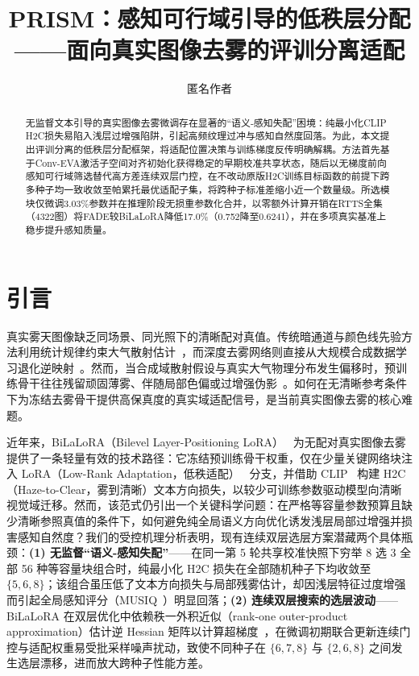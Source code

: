 \documentclass[10pt,twocolumn,letterpaper]{article}
\title{PRISM：感知可行域引导的低秩层分配\\——面向真实图像去雾的评训分离适配}
\author{匿名作者}
\begin{document}
\maketitle
\raggedbottom
\begin{abstract}
无监督文本引导的真实图像去雾微调存在显著的“语义-感知失配”困境：纯最小化CLIP H2C损失易陷入浅层过增强陷阱，引起高频纹理过冲与感知自然度回落。为此，本文提出评训分离的低秩层分配框架\method，将适配位置决策与训练梯度反传明确解耦。方法首先基于Conv-EVA激活子空间对齐初始化获得稳定的早期校准共享状态，随后以无梯度前向感知可行域筛选替代高方差连续双层门控，在不改动原版H2C训练目标函数的前提下跨多种子均一致收敛至帕累托最优适配子集，将跨种子标准差缩小近一个数量级。所选模块仅微调3.03\%参数并在推理阶段无损重参数化合并，以零额外计算开销在RTTS全集（4322图）将FADE较BiLaLoRA降低17.0\%（0.752降至0.6241），并在多项真实基准上稳步提升感知质量。
\par\smallskip{}
\end{abstract}

\section{引言}
真实雾天图像缺乏同场景、同光照下的清晰配对真值。传统暗通道与颜色线先验方法利用统计规律约束大气散射估计~\cite{dcp2009,fattal2014}，而深度去雾网络则直接从大规模合成数据学习退化逆映射~\cite{msbdn2020,dehamer2022,dea2024}。然而，当合成域散射假设与真实大气物理分布发生偏移时，预训练骨干往往残留顽固薄雾、伴随局部色偏或过增强伪影~\cite{reside2019,dad2020,psd2021}。如何在无清晰参考条件下为冻结去雾骨干提供高保真度的真实域适配信号，是当前真实图像去雾的核心难题。

近年来，BiLaLoRA（Bilevel Layer-Positioning LoRA）~\cite{bilalora2026} 为无配对真实图像去雾提供了一条轻量有效的技术路径：它冻结预训练骨干权重，仅在少量关键网络块注入 LoRA（Low-Rank Adaptation，低秩适配）~\cite{lora2022} 分支，并借助 CLIP~\cite{clip2021} 构建 H2C（Haze-to-Clear，雾到清晰）文本方向损失，以较少可训练参数驱动模型向清晰视觉域迁移。然而，该范式仍引出一个关键科学问题：在严格等容量参数预算且缺少清晰参照真值的条件下，如何避免纯全局语义方向优化诱发浅层局部过增强并损害感知自然度？我们的受控机理分析表明，现有连续双层选层方案潜藏两个具体瓶颈：\textbf{(1) 无监督“语义-感知失配”}——在同一第 5 轮共享校准快照下穷举 8 选 3 全部 56 种等容量块组合时，纯最小化 H2C 损失在全部随机种子下均收敛至 $\{5,6,8\}$；该组合虽压低了文本方向损失与局部残雾估计，却因浅层特征过度增强而引起全局感知评分（MUSIQ~\cite{musiq2021}）明显回落；\textbf{(2) 连续双层搜索的选层波动}——BiLaLoRA 在双层优化中依赖秩一外积近似（rank-one outer-product approximation）估计逆 Hessian 矩阵以计算超梯度~\cite{bilalora2026}，在微调初期联合更新连续门控与适配权重易受批采样噪声扰动，致使不同种子在 $\{6,7,8\}$ 与 $\{2,6,8\}$ 之间发生选层漂移，进而放大跨种子性能方差。
\end{document}
